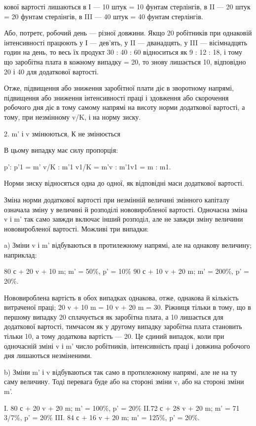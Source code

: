 кової вартості лишаються в І — 10 штук = 10 фунтам стерлінгів,
в II — 20 штук = 20 фунтам стерлінгів, в III — 40 штук = 40 фунтам
стерлінгів.

Або, потретє, робочий день — різної довжини. Якщо 20 робітників
при однаковій інтенсивності працюють у І — дев’ять,
у II — дванадцять, у III — вісімнадцять годин на день, то весь їх
продукт 30 : 40 : 60 відноситься як 9 : 12 : 18, і тому що заробітна
плата в кожному випадку = 20, то знову лишається 10, відповідно
20 і 40 для додаткової вартості.

Отже, підвищення або зниження заробітної плати діє в зворотному
напрямі, підвищення або зниження інтенсивності праці
і здовження або скорочення робочого дня діє в тому самому
напрямі на висоту норми додаткової вартості, а тому, при незмінному
v/K, і на норму зиску.

2. m' і v змінюються, К не змінюється

В цьому випадку має силу пропорція:

p': p'1 = m' v/K : m'1 v1/K = m'v : m'1v1 = m : m1.

Норми зиску відносяться одна до одної, як відповідні маси
додаткової вартості.

Зміна норми додаткової вартості при незмінній величині змінного
капіталу означала зміну у величині й розподілі нововиробленої
вартості. Одночасна зміна v і m' так само завжди включає
інший розподіл, але не завжди зміну величини нововиробленої
вартості. Можливі три випадки:

a) Зміни v і m' відбуваються в протилежному напрямі, але
на однакову величину; наприклад:

80 с + 20 v + 10 m; m' = 50\%, p' = 10\%
90 с + 10 v + 20 m; m' = 200\%, p' = 20\%.

Нововироблена вартість в обох випадках однакова, отже, однакова
й кількість витраченої праці; 20 v + 10 m = 10 v + 20 m = 30.
Ріжниця тільки в тому, що в першому випадку 20 сплачується
як заробітна плата, а 10 лишається для додаткової вартості,
тимчасом як у другому випадку заробітна плата становить
тільки 10, а тому додаткова вартість — 20. Це єдиний випадок,
коли при одночасній зміні v і m' число робітників, інтенсивність
праці і довжина робочого дня лишаються незміненими.

b) Зміни m' і v відбуваються так само в протилежному напрямі,
але не на ту саму величину. Тоді перевага буде або на
стороні зміни v, або на стороні зміни m'.

I. 80 с + 20 v + 20 m; m' = 100\%, p' = 20\%
II.72 с + 28 v + 20 m; m' = 71 3/7\%, p' = 20\%
III. 84 с + 16 v + 20 m; m' = 125\%, p' = 20\%.
